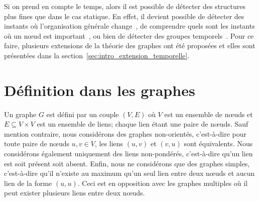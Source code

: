 Si on prend en compte le temps, alors il est possible de détecter des structures plus fines que dans le cas statique.
En effet, il devient possible de détecter des instants où l'organisation générale change~\cite{Rosvall2010}, de comprendre quels sont les instants où un n\oe ud est important~\cite{Magnien2015,Costa2015,Takaguchi2016}, ou bien de détecter des groupes temporels~\cite{Cazabet2010}.
Pour ce faire, plusieurs extensions de la théorie des graphes ont été proposées et elles sont présentées dans la section~\ref{sec:intro_extension_temporelle}.


\section{Définition dans les graphes}
\label{sec:def_graphe}

Un graphe $G$ est défini par un couple $(V, E)$  où $V$ est un ensemble de n\oe uds et $E \subseteq V \times V$ est un ensemble de liens; chaque lien étant une paire de n\oe uds.
Sauf mention contraire, nous considérons des graphes non-orientés, c'est-à-dire pour toute paire de n\oe uds $u,v \in V$, les liens $(u,v)$ et $(v,u)$ sont équivalents.
Nous considérons également uniquement des liens non-pondérés, c'est-à-dire qu'un lien est soit présent soit absent.
Enfin, nous ne considérons que des graphes simples, c'est-à-dire qu'il n'existe au maximum qu'un seul lien entre deux n\oe uds et aucun lien de la forme $(u,u)$.
Ceci est en opposition avec les graphes multiples où il peut exister plusieurs liens entre deux n\oe uds.

